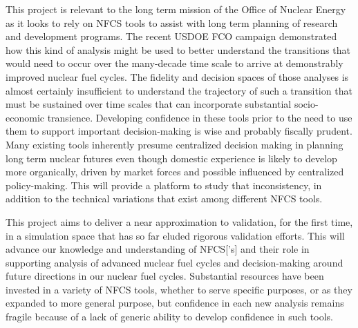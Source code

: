 This project is relevant to the long term mission of the Office of Nuclear
Energy as it looks to rely on \gls{NFCS} tools to assist with long term planning
of research and development programs.  The recent \gls{USDOE} \gls{FCO}
campaign demonstrated how this kind of analysis might be used to better
understand the transitions that would need to occur over the many-decade time
scale to arrive at demonstrably improved nuclear fuel cycles.  The fidelity
and decision spaces of those analyses is almost certainly insufficient to
understand the trajectory of such a transition that must be sustained over
time scales that can incorporate substantial socio-economic transience.
Developing confidence in these tools prior to the need to use them to support
important decision-making is wise and probably fiscally prudent.  Many
existing tools inherently presume centralized decision making in planning long
term nuclear futures even though domestic experience is likely to develop more
organically, driven by market forces and possible influenced by centralized
policy-making.  This will provide a platform to study that inconsistency, in
addition to the technical variations that exist among different \gls{NFCS}
tools.


This project aims to deliver a near approximation to validation, for the first
time, in a simulation space that has so far eluded rigorous validation
efforts.  This will advance our knowledge and understanding of \gls{NFCS}['s]
and their role in supporting analysis of advanced nuclear fuel cycles and
decision-making around future directions in our nuclear fuel cycles.
Substantial resources have been invested in a variety of \gls{NFCS} tools,
whether to serve specific purposes, or as they expanded to more general
purpose, but confidence in each new analysis remains fragile because of a lack
of generic ability to develop confidence in such tools.

